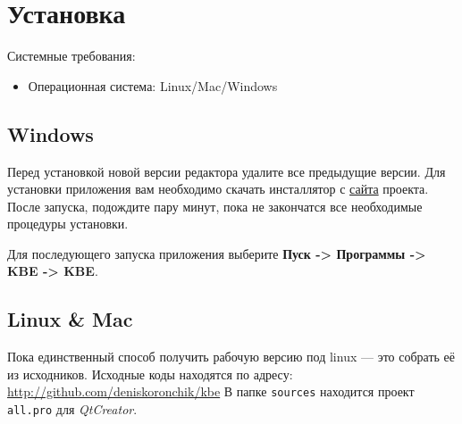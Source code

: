 \section{Установка}

Системные требования:
\begin{itemize}
	\item Операционная система: Linux/Mac/Windows
\end{itemize}

\subsection{Windows}

Перед установкой новой версии редактора удалите все пре\-дыдущие версии.
Для установки приложения вам необходимо скачать инсталлятор с \href{http://sourceforge.net/projects/ostis/}{сайта} проекта.
После запуска, подождите пару минут, пока не закончатся все необходимые процедуры установки.

Для последующего запуска приложения выберите \textbf{Пуск -> Программы -> KBE -> KBE}.

\subsection{Linux \& Mac}

Пока единственный способ получить рабочую версию под linux — это собрать её из исходников. Исходные коды находятся по адресу: \href{http://github.com/deniskoronchik/kbe}{http://github.com/deniskoronchik/kbe}
В папке {\tt sources} находится проект {\tt all.pro} для \textit{QtCreator}.

